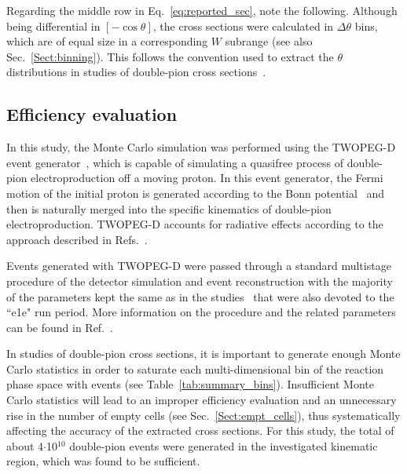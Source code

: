 \documentclass[prc,twocolumn,superscriptaddress,showpacs,amssymb,amsmath,amsfonts,aps,nofootinbib]{revtex4-1}
\begin{document}
Regarding the middle row in Eq.\!~\eqref{eq:reported_sec}, note the following. Although being differential in $[-\cos\theta]$, the cross sections were calculated in $\Delta \theta$ bins, which are of equal size in a corresponding $W$ subrange (see also Sec.\!~\ref{Sect:binning}). This follows the convention used to extract the $\theta$ distributions in studies of double-pion cross sections~\cite{Rip_an_note:2002,Ripani:2002ss,Fed_an_note:2007,Fedotov:2008aa,Isupov:2017lnd,Arjun,Fed_an_note:2017,Fed_paper_2018}.


\subsection{Efficiency evaluation}
\label{Sect:eff_eval}

In this study, the Monte Carlo simulation was performed using the TWOPEG-D event generator~\cite{twopeg-d}, which is capable of simulating a quasifree process of double-pion electroproduction off a moving proton. In this event generator, the Fermi motion of the initial proton is generated according to the Bonn potential~\cite{Machleidt:1987hj} and then is naturally merged into the specific kinematics of double-pion electroproduction. TWOPEG-D accounts for radiative effects according to the approach described in Refs.\!~\cite{Mo:1968cg,twopeg}.

Events generated with TWOPEG-D were passed through a standard multistage procedure of the detector simulation and event reconstruction with the majority of the parameters kept the same as in the studies~\cite{Fed_an_note:2017,Fed_paper_2018,Markov:2014,Ye_Tian:2017,CLAS:2022kta} that were also devoted to the ``e1e" run period. More information on the procedure and the related parameters can be found in Ref.\!~\cite{my_an_note:2020}.


In studies of double-pion cross sections, it is important to generate enough Monte Carlo statistics in order to saturate each multi-dimensional bin of the reaction phase space with events (see Table~\ref{tab:summary_bins}). Insufficient Monte Carlo statistics will lead to an improper efficiency evaluation and an unnecessary rise in the number of empty cells (see Sec.\!~\ref{Sect:empt_cells}), thus systematically affecting the accuracy of the extracted cross sections. For this study, the total of about 4$\cdot$10$^{10}$ double-pion events were generated in the investigated kinematic region, which was found to be sufficient.
\end{document}

